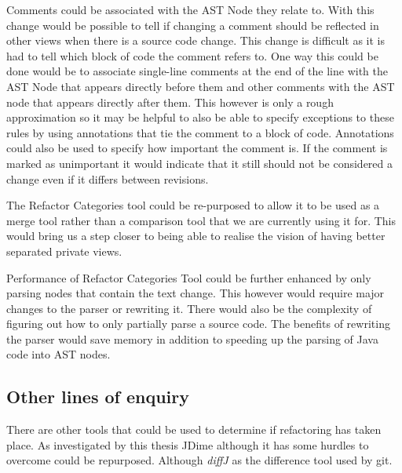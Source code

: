 Comments could be associated with the AST Node they relate to.  
With this change would be possible to tell if changing a comment should be reflected in other views when there is a source code change. 
This change is difficult as it is had to tell which block of code the comment refers to.  
One way this could be done would be to associate single-line comments at the end of the line with the AST Node that appears directly before them and other comments with the AST node that appears directly after them.  
This however is only a rough approximation so it may be helpful to also be able to specify exceptions to these rules by using annotations that tie the comment to a block of code. Annotations could also be used to specify how important the comment is.
If the comment is marked as unimportant it would indicate that it still should not be considered a change even if it differs between revisions.

The Refactor Categories tool could be re-purposed to allow it to be used as a merge tool rather than a comparison tool that we are currently using it for.  
This would bring us a step closer to being able to realise the vision of having better separated private views.  

Performance of Refactor Categories Tool could be further enhanced by only parsing nodes that contain the text change.  This however would require major changes to the parser or rewriting it. There would also be the complexity of figuring out how to only partially parse a source code. The benefits of rewriting the parser would save memory in addition to speeding up the parsing of Java code into AST nodes.


\subsection{Other lines of enquiry}

There are other tools that could be used to determine if refactoring has taken place.
As investigated by this thesis JDime although it has some hurdles to overcome could be repurposed.
Although \emph{diffJ} as the difference tool used by git.


% 
% 
% 
% 
% 
% 
